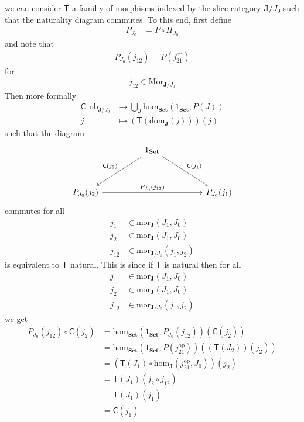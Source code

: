we can consider $\mathsf{T}$ a familiy of morphisms indexed by the slice category $\mathbf{J} \slash J_{0}$ such that the naturality diagram commutes. To this end, first define
\begin{align*}
  P_{J_{0}}
  &=
  P
  \circ
  \Pi_{J_{0}}
\end{align*}
and note that
\begin{align*}
  P_{J_{0}}(j_{12})
  =
  P(j_{21}^{\textrm{op}})
\end{align*}
for
\begin{align*}
  j_{12}
  \in
  \mathrm{Mor}_{\mathbf{J} \slash J_{0}}
\end{align*}
Then more formally
\begin{align*}
  \mathsf{C}
  \colon
  \mathrm{ob}_{\mathbf{J} \slash J_{0}}
  &\rightarrow
  \bigcup_{J}
  \mathrm{hom}_{\mathbf{Set}}(1_{\mathbf{Set}},P(J))
  \\
  j
  &\mapsto
  (\mathsf{T}(\mathrm{dom}_{\mathbf{J}}(j)))(j)
\end{align*}
such that the diagram
\[
\begin{tikzcd}[sep=huge]
  &
  1_{\mathbf{Set}}
  \arrow{dr}{\mathsf{C}(j_{1})}
  \arrow[swap]{dl}{\mathsf{C}(j_{2})}
  &
  \\
  P_{J_{0}}(j_{2})
  \arrow{rr}{P_{J_{0}}(j_{12})}
  &
  &
  P_{J_{0}}(j_{1})
\end{tikzcd}
\]
commutes for all
\begin{align*}
  j_{1}
  &\in
  \mathrm{mor}_{\mathbf{J}}(J_{1},J_{0})
  \\
  j_{2}
  &\in
  \mathrm{mor}_{\mathbf{J}}(J_{1},J_{0})
  \\
  j_{12}
  &\in
  \mathrm{mor}_{\mathbf{J} \slash J_{0}}(j_{1},j_{2})
\end{align*}
is equivalent to $\mathsf{T}$ natural. This is since if $\mathsf{T}$ is natural then for all
\begin{align*}
  j_{1}
  &\in
  \mathrm{mor}_{\mathbf{J}}(J_{1},J_{0})
  \\
  j_{2}
  &\in
  \mathrm{mor}_{\mathbf{J}}(J_{1},J_{0})
  \\
  j_{12}
  &\in
  \mathrm{mor}_{\mathbf{J} \slash J_{0}}(j_{1},j_{2})
\end{align*}
we get
\begin{align*}
  P_{J_{0}}(j_{12})
  \circ
  \mathsf{C}(j_{2})
  &=
  \mathrm{hom}_{\mathbf{Set}}(1_{\mathbf{Set}},P_{J_{0}}(j_{12}))
  (\mathsf{C}(j_{2}))
  \\
  &=
  \mathrm{hom}_{\mathbf{Set}}
  \left(
    1_{\mathbf{Set}},
    P(j_{21}^{\textrm{op}})
  \right)
  \left(
    (\mathsf{T}(J_{2}))(j_{2})
  \right)
  \\
  &=
  \left(
    \mathsf{T}(J_{1})
    \circ
    \mathrm{hom}_{\mathbf{J}}
    \left(
      j_{21}^{\textrm{op}},
      J_{0}
    \right)
  \right)
  (j_{2})
  \tag{NT}
  \\
  &=
  \mathsf{T}(J_{1})
  \left(
    j_{2}
    \circ
    j_{12}
  \right)
  \\
  &=
  \mathsf{T}(J_{1})(j_{1})
  \\
  &=
  \mathsf{C}(j_{1})
\end{align*}
